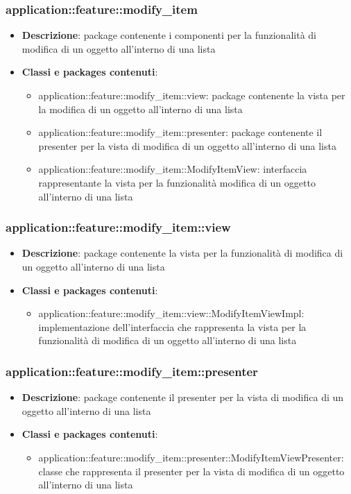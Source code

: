 \subsubsection{application::feature::modify\_item}
\begin{itemize}
	\item \textbf{Descrizione}: package contenente i componenti per la funzionalità di modifica di un oggetto all'interno di una lista
	\item \textbf{Classi e packages contenuti}:
	\begin{itemize}
	\item application::feature::modify\_item::view: package contenente la vista per la modifica di un oggetto all'interno di una lista
	\item application::feature::modify\_item::presenter: package contenente il presenter per la vista di modifica di un oggetto all'interno di una lista
	\item application::feature::modify\_item::ModifyItemView: interfaccia rappresentante la vista per la funzionalità modifica di un oggetto all'interno di una lista
	\end{itemize}
\end{itemize}

\subsubsection{application::feature::modify\_item::view}
\begin{itemize}
	\item \textbf{Descrizione}: package contenente la vista per la funzionalità di modifica di un oggetto all'interno di una lista
	\item \textbf{Classi e packages contenuti}:
	\begin{itemize}
	\item application::feature::modify\_item::view::ModifyItemViewImpl: implementazione dell'interfaccia che rappresenta la vista per la funzionalità di modifica di un oggetto all'interno di una lista
	\end{itemize}
\end{itemize}

\subsubsection{application::feature::modify\_item::presenter}
\begin{itemize}
	\item \textbf{Descrizione}: package contenente il presenter per la vista di modifica di un oggetto all'interno di una lista
	\item \textbf{Classi e packages contenuti}:
	\begin{itemize}
	\item application::feature::modify\_item::presenter::ModifyItemViewPresenter: classe che rappresenta il presenter per la vista di modifica di un oggetto all'interno di una lista
	\end{itemize}
\end{itemize}


